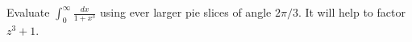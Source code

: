 Evaluate $\int_0^{\infty} \frac{dx}{1+x^3}$ using ever larger pie
slices of angle $2\pi/3$. It will help to factor $z^3+1$.

